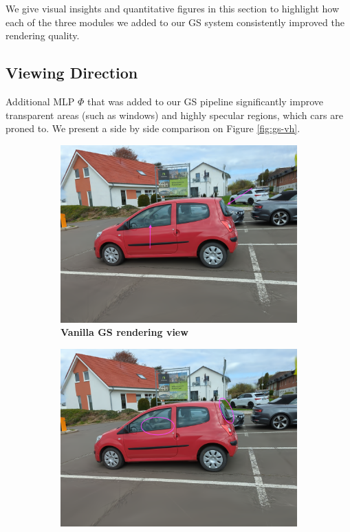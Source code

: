 We give visual insights and quantitative figures in this section to highlight how  each of the three modules we added to our GS system consistently improved the rendering quality. 

\subsection{Viewing Direction}

Additional MLP $\Phi$ that was added to our GS pipeline significantly improve transparent areas (such as windows) and highly specular regions, which cars are proned to.  We present a side by side comparison on Figure \ref{fig:gs-vh}. 



\begin{figure}[htb!]
  \centering
  \begin{subfigure}[b]{0.48\linewidth}
    \includegraphics[width=\linewidth]{images/gaussiansplatting/00023-gs.png}
    \caption{\textbf{Vanilla GS rendering view}}
    \label{fig:view3}
  \end{subfigure}
  \quad %
  \begin{subfigure}[b]{0.48\linewidth}
    \includegraphics[width=\linewidth]{images/gaussiansplatting/00023-gs-vd.png}

\end{subfigure}
\end{figure}

